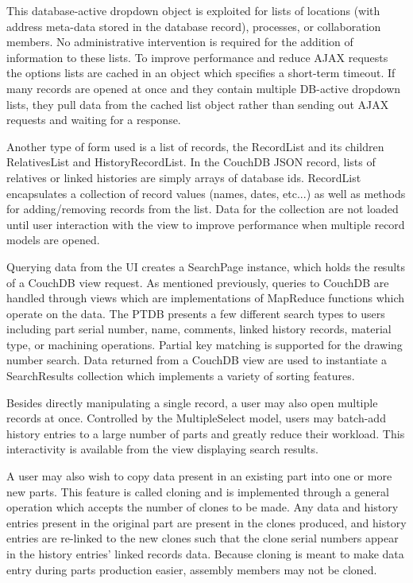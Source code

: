 \documentclass[journal]{IEEEtran}
\begin{document}
This database-active dropdown object is exploited for lists of locations (with address meta-data
stored in the database record), processes, or collaboration members. No administrative intervention
is required for the addition of information to these lists. To improve performance and reduce
AJAX requests the options lists are cached in an object which specifies a short-term timeout.
If many records are opened at once and they contain multiple DB-active dropdown lists, they 
pull data from the cached list object rather than sending out AJAX requests and waiting for 
a response.

Another type of form used is a list of records, the RecordList and its children RelativesList and HistoryRecordList. 
In the CouchDB JSON record, lists of relatives or linked histories are simply arrays of database ids.
RecordList encapsulates a collection of record values (names, dates, etc...)
as well as methods for adding/removing records from the list. Data for the collection are not loaded
until user interaction with the view to improve performance when multiple record models are opened.

Querying data from the UI creates a SearchPage instance, which holds the results of a CouchDB view request.
As mentioned previously, queries to CouchDB are handled through views which are implementations of
MapReduce functions which operate on the data. The PTDB presents a few different search types to users including
part serial number, name, comments, linked history records, material type, or machining operations.
Partial key matching is supported for the drawing number search.
Data returned from a CouchDB view are used to instantiate a SearchResults collection which implements a variety of
sorting features. 

Besides directly manipulating a single record, a user may also open multiple records at once.
Controlled by the MultipleSelect model, users may batch-add history entries to a
large number of parts and greatly reduce their workload. This interactivity is available from
the view displaying search results.

A user may also wish to copy data present in an existing part into one or more new parts. This
feature is called cloning and is implemented through a general operation which accepts the number
of clones to be made. Any data and history entries present in the original part are present in the
clones produced, and history entries are re-linked to the new clones such that the clone serial
numbers appear in the history entries' linked records data. Because cloning is meant to make
data entry during parts production easier, assembly members may not be cloned. 
\end{document}
